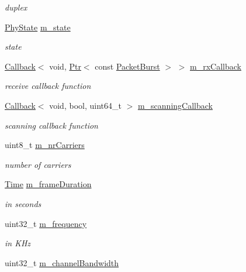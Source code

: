 \begin{DoxyCompactItemize}
\begin{DoxyCompactList}\small\item\em duplex \end{DoxyCompactList}\item 
\hyperlink{classns3_1_1WimaxPhy_a9cc75c9e84f88fc3064bba918eee1f78}{Phy\+State} \hyperlink{classns3_1_1WimaxPhy_ae196e8ac418d8e75cf0f8a90b875b6c1}{m\+\_\+state}
\begin{DoxyCompactList}\small\item\em state \end{DoxyCompactList}\item 
\hyperlink{classns3_1_1Callback}{Callback}$<$ void, \hyperlink{classns3_1_1Ptr}{Ptr}$<$ const \hyperlink{classns3_1_1PacketBurst}{Packet\+Burst} $>$ $>$ \hyperlink{classns3_1_1WimaxPhy_aa7f701c8e479dce488d00e7db8f70d11}{m\+\_\+rx\+Callback}
\begin{DoxyCompactList}\small\item\em receive callback function \end{DoxyCompactList}\item 
\hyperlink{classns3_1_1Callback}{Callback}$<$ void, bool, uint64\+\_\+t $>$ \hyperlink{classns3_1_1WimaxPhy_abc56220a06166fa9f44df58cc9ed5efb}{m\+\_\+scanning\+Callback}
\begin{DoxyCompactList}\small\item\em scanning callback function \end{DoxyCompactList}\item 
uint8\+\_\+t \hyperlink{classns3_1_1WimaxPhy_aa48c239218c08d5eb0975dfb628bcc20}{m\+\_\+nr\+Carriers}
\begin{DoxyCompactList}\small\item\em number of carriers \end{DoxyCompactList}\item 
\hyperlink{classns3_1_1Time}{Time} \hyperlink{classns3_1_1WimaxPhy_ad9eff9acb74c6909da8b2db9cc003770}{m\+\_\+frame\+Duration}
\begin{DoxyCompactList}\small\item\em in seconds \end{DoxyCompactList}\item 
uint32\+\_\+t \hyperlink{classns3_1_1WimaxPhy_a9ff835622336fec214af2754fd9ee0cc}{m\+\_\+frequency}
\begin{DoxyCompactList}\small\item\em in K\+Hz \end{DoxyCompactList}\item 
uint32\+\_\+t \hyperlink{classns3_1_1WimaxPhy_a3340a4f7c5ff2d51553ee6515d552edf}{m\+\_\+channel\+Bandwidth}

\end{DoxyCompactItemize}
